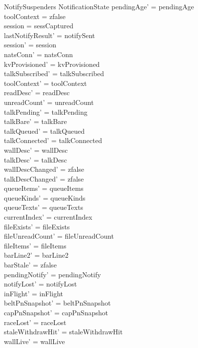 \documentclass[a4paper,10pt,fleqn]{article}
\begin{document}
\begin{schema}{NotifySuspenders}
  \Delta NotificationState
  \where
  pendingAge' = pendingAge \\
  toolContext = zfalse \\
  session = sessCaptured \\
  lastNotifyResult' = notifySent \\
  session' = session \\
  natsConn' = natsConn \\
  kvProvisioned' = kvProvisioned \\
  talkSubscribed' = talkSubscribed \\
  toolContext' = toolContext \\
  readDesc' = readDesc \\
  unreadCount' = unreadCount \\
  talkPending' = talkPending \\
  talkBare' = talkBare \\
  talkQueued' = talkQueued \\
  talkConnected' = talkConnected \\
  wallDesc' = wallDesc \\
  talkDesc' = talkDesc \\
  wallDescChanged' = zfalse \\
  talkDescChanged' = zfalse \\
  queueItems' = queueItems \\
  queueKinds' = queueKinds \\
  queueTexts' = queueTexts \\
  currentIndex' = currentIndex \\
  fileExists' = fileExists \\
  fileUnreadCount' = fileUnreadCount \\
  fileItems' = fileItems \\
  barLine2' = barLine2 \\
  barStale' = zfalse \\
  pendingNotify' = pendingNotify \\
  notifyLost' = notifyLost \\
  inFlight' = inFlight \\
  beltPnSnapshot' = beltPnSnapshot \\
  capPnSnapshot' = capPnSnapshot \\
  raceLost' = raceLost \\
  staleWithdrawHit' = staleWithdrawHit \\
  wallLive' = wallLive \\

\end{schema}
\end{document}
